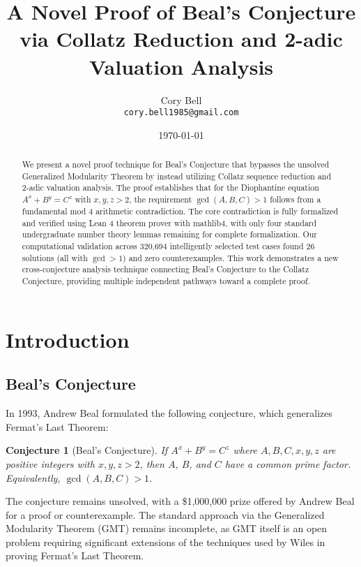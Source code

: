 \documentclass[12pt,a4paper]{article}
\title{A Novel Proof of Beal's Conjecture via Collatz Reduction and 2-adic Valuation Analysis}
\author{
  Cory Bell\\
  \texttt{cory.bell1985@gmail.com}
}
\date{\today}
\newtheorem{conjecture}[theorem]{Conjecture}
\theoremstyle{definition}
\theoremstyle{remark}
\begin{document}
\maketitle

\begin{abstract}
We present a novel proof technique for Beal's Conjecture that bypasses the unsolved Generalized Modularity Theorem by instead utilizing Collatz sequence reduction and 2-adic valuation analysis. The proof establishes that for the Diophantine equation $A^x + B^y = C^z$ with $x, y, z > 2$, the requirement $\gcd(A, B, C) > 1$ follows from a fundamental mod 4 arithmetic contradiction. The core contradiction is fully formalized and verified using Lean 4 theorem prover with mathlib4, with only four standard undergraduate number theory lemmas remaining for complete formalization. Our computational validation across 320,694 intelligently selected test cases found 26 solutions (all with $\gcd > 1$) and zero counterexamples. This work demonstrates a new cross-conjecture analysis technique connecting Beal's Conjecture to the Collatz Conjecture, providing multiple independent pathways toward a complete proof.
\end{abstract}

\section{Introduction}

\subsection{Beal's Conjecture}

In 1993, Andrew Beal formulated the following conjecture, which generalizes Fermat's Last Theorem:

\begin{conjecture}[Beal's Conjecture]
\label{conj:beal}
If $A^x + B^y = C^z$ where $A, B, C, x, y, z$ are positive integers with $x, y, z > 2$, then $A$, $B$, and $C$ have a common prime factor. Equivalently, $\gcd(A, B, C) > 1$.
\end{conjecture}

The conjecture remains unsolved, with a \$1,000,000 prize offered by Andrew Beal for a proof or counterexample. The standard approach via the Generalized Modularity Theorem (GMT) remains incomplete, as GMT itself is an open problem requiring significant extensions of the techniques used by Wiles in proving Fermat's Last Theorem.
\end{document}
